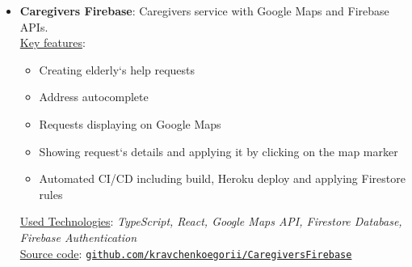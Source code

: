 \begin{itemize}[noitemsep]
    \item{\textbf{Caregivers Firebase}}: Caregivers service with Google Maps and Firebase APIs.
    \\ \underline{Key features}:
    \begin{itemize}[noitemsep]
        \item Creating elderly`s help requests
        \item Address autocomplete
        \item Requests displaying on Google Maps
        \item Showing request`s details and applying it by clicking on the map marker
        \item Automated CI/CD including build, Heroku deploy and applying Firestore rules
    \end{itemize}
    \underline{Used Technologies}: \textit{TypeScript, React, Google Maps API, Firestore Database, Firebase Authentication } \\
    \underline{Source code}: \href{https://github.com/kravchenkoegorii/CaregiversFirebase}
    {\verb"github.com/kravchenkoegorii/CaregiversFirebase"}
\end{itemize}